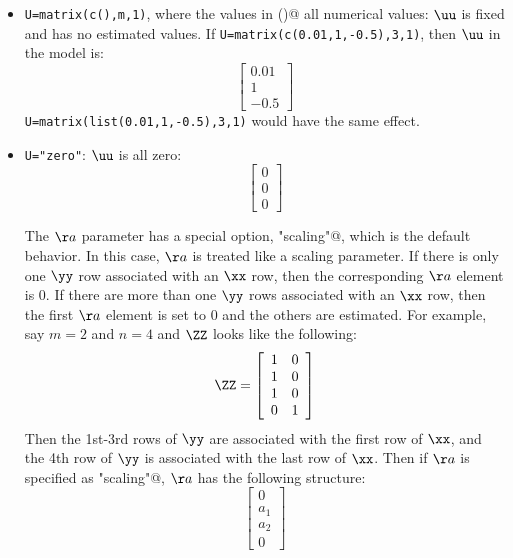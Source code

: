 \begin{itemize}
\item[] \texttt{U=matrix(c(),m,1)}, where the values in \verb@c()@ all numerical values: $\uu$ is fixed and has no estimated values.  If   \texttt{U=matrix(c(0.01,1,-0.5),3,1)}, then $\uu$ in the model is:
\begin{equation*}
 \left[ \begin{array}{c}
    0.01 \\
    1 \\
    -0.5 \end{array} \right]
\end{equation*}
\texttt{U=matrix(list(0.01,1,-0.5),3,1)} would have the same effect.

\item[] \texttt{U="zero"}: $\uu$ is all zero:
\begin{equation*}
 \left[ \begin{array}{c}
    0 \\
    0 \\
    0 \end{array} \right]
\end{equation*}

The $\aa$ parameter has a special option, \verb@"scaling"@, which is the default behavior.  In this case, $\aa$ is treated like a scaling parameter.  If there is only one $\yy$ row associated with an $\xx$ row, then the corresponding $\aa$ element is 0.  If there are more than one $\yy$ rows associated with an $\xx$ row, then the first $\aa$ element is set to 0 and the others are estimated.  For example, say $m=2$ and $n=4$ and $\ZZ$ looks like the following:
\begin{equation*}
 \ZZ =
  \left[ \begin{array}{cc}
    1 & 0  \\
    1 & 0  \\
    1 & 0  \\
    0 & 1  \end{array} \right]
\end{equation*}
Then the 1st-3rd rows of $\yy$ are associated with the first row of $\xx$, and the 4th row of $\yy$ is associated with the last row of $\xx$.  Then if $\aa$ is specified as \verb@"scaling"@, $\aa$ has the following structure:
\begin{equation*}
 \left[ \begin{array}{c}
    0 \\
    a_1 \\
    a_2 \\
    0 \end{array} \right]
\end{equation*}

\end{itemize}

